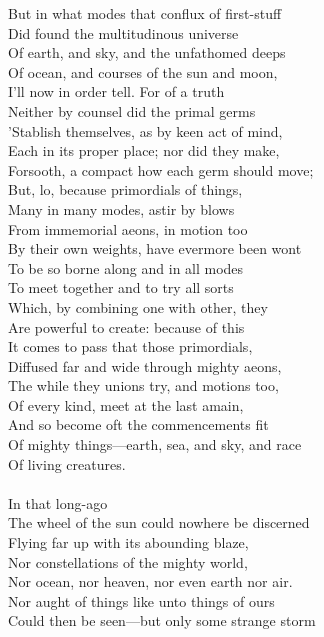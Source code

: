 But in what modes that conflux of first-stuff\\
Did found the multitudinous universe\\
Of earth, and sky, and the unfathomed deeps\\
Of ocean, and courses of the sun and moon,\\
I'll now in order tell. For of a truth\\
Neither by counsel did the primal germs\\
'Stablish themselves, as by keen act of mind,\\
Each in its proper place; nor did they make,\\
Forsooth, a compact how each germ should move;\\
But, lo, because primordials of things,\\
Many in many modes, astir by blows\\
From immemorial aeons, in motion too\\
By their own weights, have evermore been wont\\
To be so borne along and in all modes\\
To meet together and to try all sorts\\
Which, by combining one with other, they\\
Are powerful to create: because of this\\
It comes to pass that those primordials,\\
Diffused far and wide through mighty aeons,\\
The while they unions try, and motions too,\\
Of every kind, meet at the last amain,\\
And so become oft the commencements fit\\
Of mighty things—earth, sea, and sky, and race\\
Of living creatures.\\
\\
In that long-ago\\
The wheel of the sun could nowhere be discerned\\
Flying far up with its abounding blaze,\\
Nor constellations of the mighty world,\\
Nor ocean, nor heaven, nor even earth nor air.\\
Nor aught of things like unto things of ours\\
Could then be seen—but only some strange storm\\
